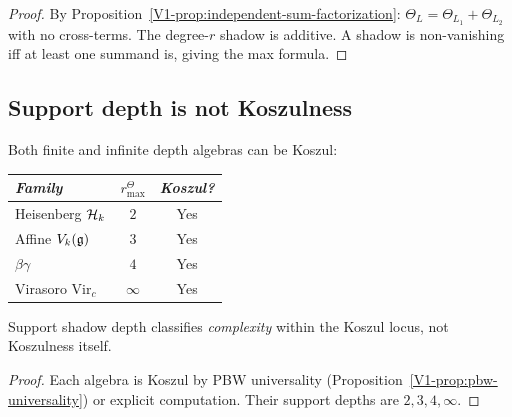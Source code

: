 \begin{proof}
By Proposition~\ref{V1-prop:independent-sum-factorization}:
$\Theta_L = \Theta_{L_1} + \Theta_{L_2}$ with no cross-terms.
The degree-$r$ shadow is additive. A shadow is non-vanishing
iff at least one summand is, giving the max formula.
\end{proof}



\subsection{Support depth is not Koszulness}

\begin{proposition}
\ClaimStatusProvedHere
{}
Both finite and infinite depth algebras can be Koszul:
\begin{center}
\small
\renewcommand{\arraystretch}{1.15}
\begin{tabular}{lcc}
\toprule
\emph{Family} & \(r^\Theta_{\max}\) & \emph{Koszul?} \\
\midrule
Heisenberg $\mathcal{H}_k$ & $2$ & Yes \\
Affine $V_k(\mathfrak{g})$ & $3$ & Yes \\
$\beta\gamma$ & $4$ & Yes \\
Virasoro $\mathrm{Vir}_c$ & $\infty$ & Yes \\
\bottomrule
\end{tabular}
\end{center}
Support shadow depth classifies \emph{complexity} within the Koszul
locus, not Koszulness itself.
\end{proposition}

\begin{proof}
Each algebra is Koszul by PBW universality
(Proposition~\ref{V1-prop:pbw-universality}) or explicit
computation. Their support depths are \(2,3,4,\infty\).
\end{proof}



